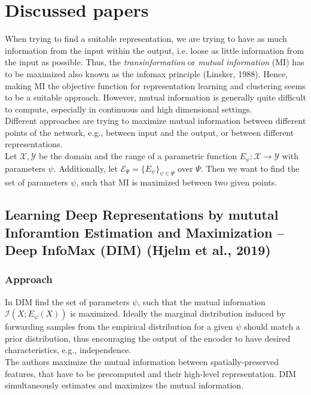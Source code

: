 \documentclass[]{article}
\begin{document}
\section{Discussed papers}
When trying to find a suitable representation, we are trying to have as much information from the input within the output, i.e. loose as little information from the input as possible. Thus, the \textit{transinformation} or \textit{mutual information} (MI) has to be maximized also known as the infomax principle (Linsker, 1988). Hence, making MI the objective function for representation learning and clustering seems to be a suitable approach. However,  mutual information is generally quite difficult to compute, especially in continuous and high dimensional settings.\\

Different approaches are trying to maximize mutual information between different points of the network, e.g., between input and the output, or between different representations.\\

Let $\mathcal{X}, \mathcal{Y}$ be the domain and the range of a parametric function
$E_\psi:\mathcal{X}\rightarrow\mathcal{Y}$ with parameters $\psi$. Additionally, let $\mathcal{E}_\Psi=\{E_\psi\}_{\psi\in\Psi}$ over $\Psi$. Then we want to find the set of parameters $\psi$, such that MI is maximized between two given points.\\

\subsection{Learning Deep Representations by mututal Inforamtion Estimation and Maximization -- Deep InfoMax (DIM) (Hjelm et al., 2019)}
\subsubsection{Approach}
In DIM find the set of parameters $\psi$, such that the mutual information $\mathcal{I}(X;E_\psi(X))$ is maximized. Ideally the marginal distribution induced by forwarding samples from the empirical distribution for a given $\psi$ should match a prior distribution, thus encouraging the output of the encoder to have desired characteristics, e.g., independence.\\
The authors maximize the mutual information between spatially-preserved features, that have to be precomputed and their high-level representation. DIM simultaneously estimates and maximizes the mutual information.\\
\end{document}
